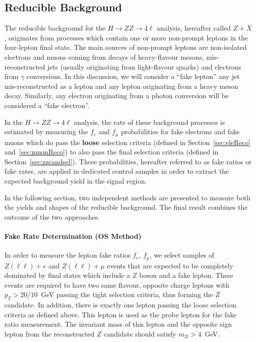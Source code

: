 \subsection{Reducible Background}
\label{sec:zxIntr}
%

The reducible background for the $H\to ZZ\to 4\ell $ analysis, hereafter called $Z+X$, originates from processes which contain one or more non-prompt leptons in the four-lepton final state. 
The main sources of non-prompt leptons are non-isolated electrons and muons coming from decays of heavy-flavour mesons, mis-reconstructed jets (usually originating from light-flavour quarks) and electrons from $\gamma$ conversions. 
In this discussion, we will consider a ``fake lepton'' any jet mis-reconstructed as a lepton and any lepton originating from a heavy meson decay.
Similarly, any electron originating from a photon conversion will be considered a ``fake electron''.

In the $H\to ZZ\to 4\ell $ analysis, the rate of these background processes is estimated by measuring the $f_{e}$ and $f_{\mu}$ probabilities for fake electrons and fake muons which do pass the {\bf loose} selection criteria (defined in Section~\ref{sec:eleReco} and~\ref{sec:muonReco}) to also pass the final selection criteria (defined in Section~\ref{sec:zzcandsel}).  
These probabilities, hereafter referred to as fake ratios or fake rates, are applied in dedicated control samples in order to extract the expected background yield in the signal region. 

In the following section, two independent methods are presented to measure both the yields and shapes of the reducible background. The final result combines the outcome of the two approaches. 

\paragraph{Fake Rate Determination (OS Method)}
In order to measure the lepton fake ratios $f_{e}$, $f_{\mu}$, we select samples of $Z(\ell\ell)+e$ and $Z(\ell\ell)+\mu$ events that are expected to be completely dominated by final states which include a $Z$ boson and a fake lepton. 
These events are required to have two same flavour, opposite charge leptons with $p_{T} > 20/10$~GeV passing the tight selection criteria, thus forming the $Z$ candidate. In addition, there is exactly one lepton passing the loose selection criteria as defined above. 
This lepton is used as the probe lepton for the fake ratio measurement. The invariant mass of this lepton and the opposite sign lepton from the reconstructed $Z$ candidate should satisfy $m_{2l} > 4$~GeV. 


